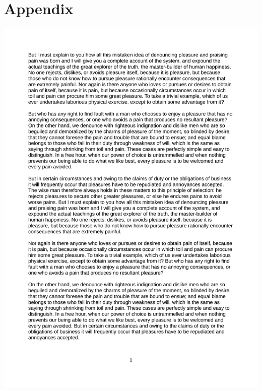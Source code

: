 \appendix
\section{Appendix} \label{app:bsp-text}

\begin{center} %
	\includegraphics[trim = 0mm 0mm 0mm 0mm,clip, page = 1, width=1\textwidth]{Data/Example_Text.pdf}\\
\end{center}

